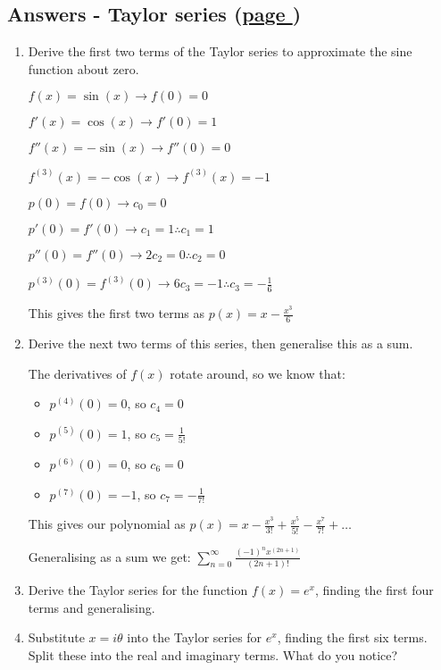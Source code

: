 \documentclass[../main.tex]{subfiles}
\begin{document}
\hypertarget{taylorseriesanswers}{\subsection*{Answers - Taylor series (\hyperlink{taylorserieslink} {page \pageref{taylor series}})}}

\label{Taylor series answers}
\begin{enumerate}[itemsep=0.7cm]
    \item 
    Derive the first two terms of the Taylor series to approximate the sine function about zero.

    $f(x) = \sin{(x)} \rightarrow f(0)=0$

    $f'(x) = \cos{(x)} \rightarrow f'(0)=1$

    $f''(x) = -\sin{(x)} \rightarrow f''(0)=0$
    
    $f^{(3)}(x) = -\cos{(x)} \rightarrow f^{(3)}(x)=-1$

    $p(0) = f(0) \rightarrow c_0 = 0$

    $p'(0) = f'(0) \rightarrow c_1 = 1 \therefore c_1 = 1$

    $p''(0) = f''(0) \rightarrow 2c_2 = 0 \therefore c_2 = 0$

    $p^{(3)}(0) = f^{(3)}(0) \rightarrow 6c_3 = -1 \therefore c_3 = -\frac{1}{6}$

    This gives the first two terms as $p(x) = x - \frac{x^3}{6}$

    \item 
    Derive the next two terms of this series, then generalise this as a sum.

    The derivatives of $f(x)$ rotate around, so we know that:
    \begin{itemize}
        \item     $p^{(4)}(0)=0$, so $c_4 = 0$
        \item     $p^{(5)}(0)=1$, so $c_5 = \frac{1}{5!}$
        \item      $p^{(6)}(0)=0$, so $c_6 = 0$
        \item       $p^{(7)}(0)=-1$, so $c_7 = -\frac{1}{7!}$  
    \end{itemize}

    This gives our polynomial as $p(x) = x - \frac{x^3}{3!} + \frac{x^5}{5!} - \frac{x^7}{7!} + \dots$

    Generalising as a sum we get:
    $\sum_{n=0}^{\infty} \frac{(-1)^n x^{(2n+1)}}{(2n+1)!}$

    \item
    Derive the Taylor series for the function $f(x)=e^x$, finding the first four terms and generalising.

    \item
    Substitute $x=i\theta$ into the Taylor series for $e^x$, finding the first six terms. Split these into the real and imaginary terms. What do you notice?
    

\end{enumerate}
\end{document}
